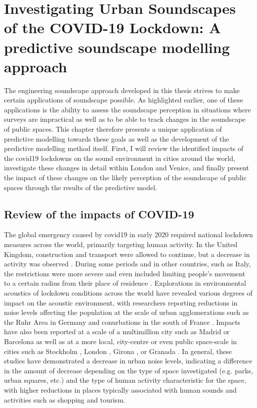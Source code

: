 \chapter{Investigating Urban Soundscapes of the COVID-19 Lockdown: A predictive soundscape modelling approach}
\label{ch:lockdown}

The engineering soundscape approach developed in this thesis strives to make certain applications of soundscape possible. As highlighted earlier, one of these applications is the ability to assess the soundscape perception in situations where surveys are impractical as well as to be able to track changes in the soundscape of public spaces. This chapter therefore presents a unique application of predictive modelling towards these goals as well as the development of the predictive modelling method itself. First, I will review the identified impacts of the \gls{covid19} lockdowns on the sound environment in cities around the world, investigate these changes in detail within London and Venice, and finally present the impact of these changes on the likely perception of the soundscape of public spaces through the results of the predictive model. 


\section{Review of the impacts of COVID-19}
 \label{sec:covidReview}
 The global emergency caused by \gls{covid19} in early 2020 required national lockdown measures across the world, primarily targeting human activity. In the United Kingdom, construction and transport were allowed to continue, but a decrease in activity was observed \citep{Hadjidemetriou2020impact}. During some periods and in other countries, such as Italy, the restrictions were more severe and even included limiting people's movement to a certain radius from their place of residence \citep{Ren2020Pandemic}. Explorations in environmental acoustics of lockdown conditions across the world have revealed various degrees of impact on the acoustic environment, with researchers reporting reductions in noise levels affecting the population at the scale of urban agglomerations such as the Ruhr Area in Germany \citep{Hornberg2021Impact} and conurbations in the south of France \citep{Munoz2020Lockdown}. Impacts have also been reported at a scale of a multimillion city such as Madrid \citep{Asensio2020Changes} or Barcelona \citep{BonetSola2021Soundscape} as well as at a more local, city-centre or even public space-scale in cities such as Stockholm \citep{Rumpler2021Noise}, London \citep{Aletta2020Assessing}, Girona \citep{AlsinaPages2021Changes}, or Granada \citep{VidaManzano2021sound}. In general, these studies have demonstrated a decrease in urban noise levels, indicating a difference in the amount of decrease depending on the type of space investigated (e.g. parks, urban squares, etc.) and the type of human activity characteristic for the space, with higher reductions in places typically associated with human sounds and activities such as shopping and tourism.

